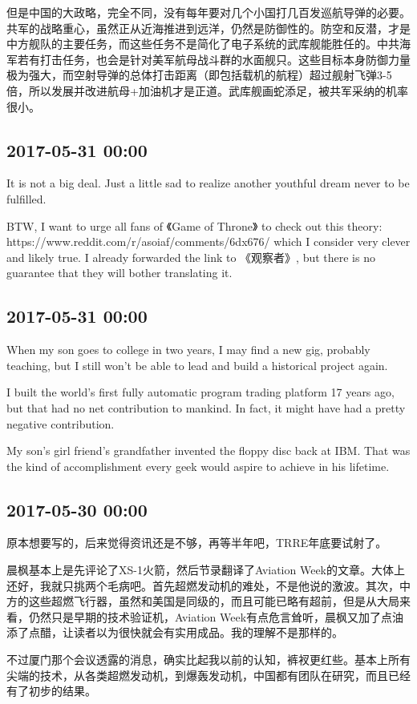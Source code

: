 \documentclass[twocolumn]{ctexart}
\begin{document}
但是中国的大政略，完全不同，没有每年要对几个小国打几百发巡航导弹的必要。共军的战略重心，虽然正从近海推进到远洋，仍然是防御性的。防空和反潜，才是中方舰队的主要任务，而这些任务不是简化了电子系统的武库舰能胜任的。中共海军若有打击任务，也会是针对美军航母战斗群的水面舰只。这些目标本身防御力量极为强大，而空射导弹的总体打击距离（即包括载机的航程）超过舰射飞弹3-5倍，所以发展并改进航母+加油机才是正道。武库舰画蛇添足，被共军采纳的机率很小。\subsection*{2017-05-31 00:00}
It is not a big deal. Just a little sad to realize another youthful dream never to be fulfilled.

BTW, I want to urge all fans of 《Game of Throne》 to check out this theory: https://www.reddit.com/r/asoiaf/comments/6dx676/ 
which I consider very clever and likely true. I already forwarded the link to 《观察者》, but there is no guarantee that they will bother translating it.\subsection*{2017-05-31 00:00}
When my son goes to college in two years, I may find a new gig, probably teaching, but I still won't be able to lead and build a historical project again. 

I built the world's first fully automatic program trading platform 17 years ago, but that had no net contribution to mankind. In fact, it might have had a pretty negative contribution.

My son's girl friend's grandfather invented the floppy disc back at IBM. That was the kind of accomplishment every geek would aspire to achieve in his lifetime.\subsection*{2017-05-30 00:00}
原本想要写的，后来觉得资讯还是不够，再等半年吧，TRRE年底要试射了。

晨枫基本上是先评论了XS-1火箭，然后节录翻译了Aviation Week的文章。大体上还好，我就只挑两个毛病吧。首先超燃发动机的难处，不是他说的激波。其次，中方的这些超燃飞行器，虽然和美国是同级的，而且可能已略有超前，但是从大局来看，仍然只是早期的技术验证机，Aviation Week有点危言耸听，晨枫又加了点油添了点醋，让读者以为很快就会有实用成品。我的理解不是那样的。

不过厦门那个会议透露的消息，确实比起我以前的认知，裤衩更红些。基本上所有尖端的技术，从各类超燃发动机，到爆轰发动机，中国都有团队在研究，而且已经有了初步的结果。
\end{document}
